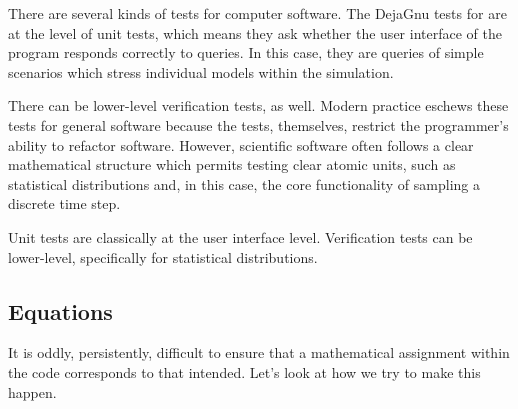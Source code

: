 \documentclass{article}
\begin{document}
There are several kinds of tests for computer software. The
DejaGnu tests for \naadsm are at the level of unit tests,
which means they ask whether the user interface of the program
responds correctly to queries. In this case, they are
queries of simple scenarios which stress individual models
within the simulation.

There can be lower-level verification tests, as well.
Modern practice eschews these tests for general software because
the tests, themselves, restrict the programmer's ability to refactor
software. However, scientific software often follows a clear
mathematical structure which permits testing clear atomic units,
such as statistical distributions and, in this case, the core
functionality of sampling a discrete time step.


Unit tests are classically at the user interface level.
Verification tests can be lower-level, specifically for statistical
distributions.


\subsection{Equations}
It is oddly, persistently, difficult to ensure that
a mathematical assignment within the code corresponds to
that intended. Let's look at how we try to make this happen.
\end{document}
